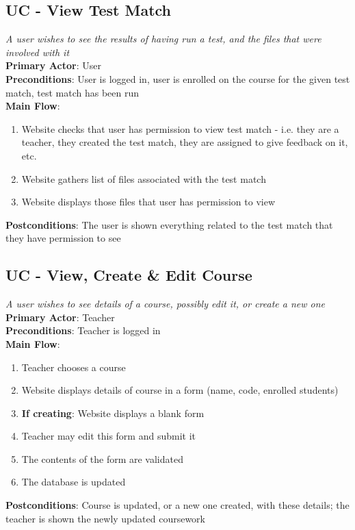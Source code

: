 \documentclass[a4paper,11pt]{report}
\begin{document}
\subsection*{UC - View Test Match}
\textit{A user wishes to see the results of having run a test, and the files that were involved with it}\\
\textbf{Primary Actor}: User\\
\textbf{Preconditions}: User is logged in, user is enrolled on the course for the given test match, test match has been run\\
\textbf{Main Flow}:
\begin{enumerate}
\item Website checks that user has permission to view test match - i.e. they are a teacher, they created the test match, they are assigned to give feedback on it, etc.
\item Website gathers list of files associated with the test match
\item Website displays those files that user has permission to view
\end{enumerate}
\textbf{Postconditions}: The user is shown everything related to the test match that they have permission to see

\subsection*{UC - View, Create \& Edit Course}
\textit{A user wishes to see details of a course, possibly edit it, or create a new one}\\
\textbf{Primary Actor}: Teacher\\
\textbf{Preconditions}: Teacher is logged in\\
\textbf{Main Flow}:
\begin{enumerate}
\item Teacher chooses a course
\item Website displays details of course in a form (name, code, enrolled students)
\item \textbf{If creating}: Website displays a blank form
\item Teacher may edit this form and submit it
\item The contents of the form are validated
\item The database is updated
\end{enumerate}
\textbf{Postconditions}: Course is updated, or a new one created, with these details; the teacher is shown the newly updated coursework
\end{document}
